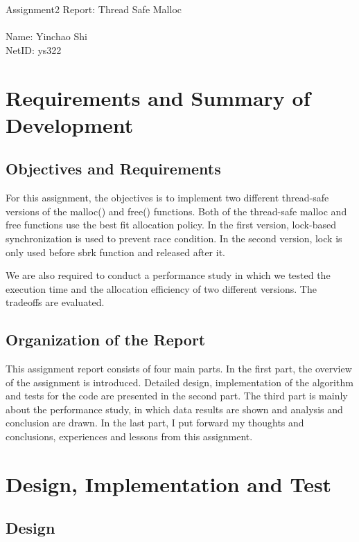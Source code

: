 \documentclass[a4paper,10pt]{article}
\begin{document}
    \begin{center}
        {\Large
        Assignment2 Report: Thread Safe Malloc}\\~\\
        Name: Yinchao Shi \\ NetID: ys322
    \end{center}
    
    \section{Requirements and Summary of Development} 
    \subsection{Objectives and Requirements}
    \par For this assignment, the objectives is to implement two different 
    thread-safe versions of the malloc() and free() functions. 
    Both of the thread-safe malloc and free functions use the best fit allocation policy.
    In the first version, lock-based synchronization is used to prevent race condition.
    In the second version, lock is only used before sbrk function and released after it.
    \par We are also required to conduct a performance study in which we tested
    the execution time and the allocation efficiency of two different versions.
    The tradeoffs are evaluated. 

    \subsection{Organization of the Report}
    \par This assignment report consists of four main parts. 
    In the first part, the overview of the assignment is introduced. 
    Detailed design, implementation of the algorithm and tests for the code 
    are presented in the second part. 
    The third part is mainly about the performance study, in which data results 
    are shown and analysis and conclusion are drawn. 
    In the last part, I put forward my thoughts and conclusions, 
    experiences and lessons from this assignment.
    
    \section{Design, Implementation and Test}
    \subsection{Design}
\end{document}
